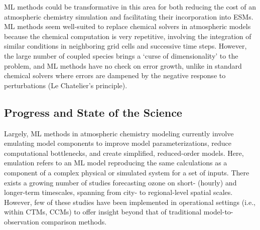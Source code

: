 \documentclass[gmd, manuscript]{copernicus}
\begin{document}
ML methods could be transformative in this area for both reducing the cost of an atmospheric chemistry simulation and facilitating their incorporation into ESMs. ML methods seem well-suited to replace chemical solvers in atmospheric models because the chemical computation is very repetitive, involving the integration of similar conditions in neighboring grid cells and successive time steps. However, the large number of coupled species brings a ‘curse of dimensionality’ to the problem, and ML methods have no check on error growth, unlike in standard chemical solvers where errors are dampened by the negative response to perturbations (Le Chatelier’s principle).
                                                 

\subsection{Progress and State of the Science}
Largely, ML methods in atmospheric chemistry modeling currently involve emulating model components to improve model parameterizations, reduce computational bottlenecks, and create simplified, reduced-order models. Here, emulation refers to an ML model reproducing the same calculations as a component of a complex physical or simulated system for a set of inputs. There exists a growing number of studies forecasting ozone on short- (hourly) \citep{yafouz_comprehensive_2022} and longer-term \citep{du_forecasting_2022, Chen2023} timescales, spanning from city- \citep{ojha_exploring_2021} to regional-level \citep{ortiz_combination_2021} spatial scales. However, few of these studies have been implemented in operational settings (i.e., within CTMs, CCMs) to offer insight beyond that of traditional model-to-observation comparison methods.   
\end{document}
